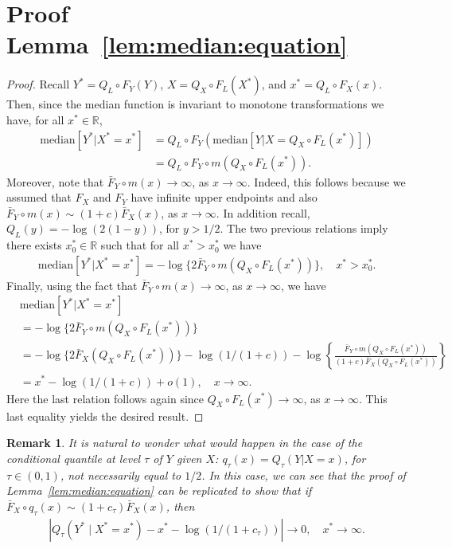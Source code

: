 \documentclass{statsoc}
\newtheorem{remark}{Remark}
\theoremstyle{break}
\def\M{\text{median}}
\newcommand{\beao}{\begin{eqnarray*}}
\newcommand{\eeao}{\end{eqnarray*}\noindent}
\begin{document}
\section{Proof Lemma~\ref{lem:median:equation}}
\begin{proof}
	Recall $Y^* = Q_L \circ F_Y(Y)$, $X = Q_X \circ F_L(X^*)$, and $x^* = Q_L \circ F_X(x)$. Then, since the median function is invariant to monotone transformations we have, for all $x^* \in \mathbb{R}$,
	\begin{align*}
		\M[Y^* | X^* = x^*]  &= Q_L \circ F_Y( \M[Y | X = Q_X\circ F_L(x^*)] ) \\
		&= Q_L \circ F_Y \circ m(Q_X\circ F_L(x^*)).
	\end{align*} 
	Moreover, note that $\bar F_Y\circ m(x) \to \infty$, as $x\to \infty$. Indeed, this follows because we assumed that $F_X$ and $F_Y$ have infinite upper endpoints and also $ \bar F_Y\circ m(x) \sim (1+c) \bar F_X(x)$, as $x \to \infty$. 
	In addition recall,
	$Q_L(y) =  -\log(2(1-y))$, for $y > 1/2$. 
	The two previous relations imply there exists $x^*_0 \in \mathbb{R}$ such that for all $x^* > x^*_0$  we have 
	\beao 
	\M[Y^* | X^* = x^*] = -\log\{2\bar F_Y \circ m(Q_X \circ F_L(x^*))\}, \quad x^* > x^*_0.
	\eeao 
	Finally, using the fact that $\bar F_Y\circ m(x) \to \infty$, as $x\to \infty$, we have
	\begin{align*}
		&\M[Y^* | X^* = x^*]\\
		&= -\log\{2\bar F_Y \circ m(Q_X \circ F_L(x^*))\}\\
		&= -\log\{2\bar F_X (Q_X \circ F_L(x^*))\} - \log(1/(1+c))
		- \log\left\{   \frac{ \bar F_Y \circ m(Q_X \circ F_L(x^*))} {(1+c)\bar F_X  (Q_X \circ F_L(x^*))}  \right\} \\
		&= x^* - \log(1/(1+c)) + o(1), \quad x \to \infty.
	\end{align*}
	Here the last relation follows again since $Q_X \circ F_L(x^*) \to \infty$, as $x \to \infty$. This last equality yields the desired result. 
\end{proof}  


\begin{remark}
	It is natural to wonder what would happen in the case of the conditional quantile at level $\tau$ of $Y$ given $X$: $q_\tau(x) = Q_\tau(Y|X=x)$, for $\tau \in (0,1)$, not necessarily equal to $1/2$. 
	In this case, we can see that the proof of Lemma~\ref{lem:median:equation} can be replicated to show that if $\bar F_X\circ q_\tau(x) \sim (1+c_\tau)\bar F_X(x)$, then 
	\beao 
	|Q_\tau(Y^* \mid X^* = x^*) - x^* - \log(1/(1+c_\tau))| \to 0, \quad x^* \to \infty.
	\eeao 
\end{remark}
\end{document}
